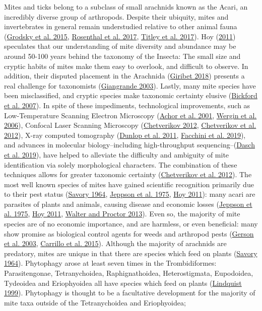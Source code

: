 \documentclass{ufdissertation}[overrideChapters] %
\begin{document}
{Mites and ticks belong to a subclass of small arachnids known as the Acari, an incredibly diverse group of arthropods. Despite their ubiquity, mites and invertebrates in general remain understudied relative to other animal fauna (\protect\hyperlink{ref-Grodsky2015}{Grodsky et al. 2015}, \protect\hyperlink{ref-Rosenthal2017}{Rosenthal et al. 2017}, \protect\hyperlink{ref-Titley2017}{Titley et al. 2017}). Hoy (\protect\hyperlink{ref-Hoy2011}{2011}) speculates that our understanding of mite diversity and abundance may be around 50-100 years behind the taxonomy of the Insecta: The small size and cryptic habits of mites make them easy to overlook, and difficult to observe. In addition, their disputed placement in the Arachnida (\protect\hyperlink{ref-Giribet2018}{Giribet 2018}) presents a real challenge for taxonomists (\protect\hyperlink{ref-Giangrande2003}{Giangrande 2003}). Lastly, many mite species have been misclassified, and cryptic species make taxonomic certainty elusive (\protect\hyperlink{ref-Bickford2007}{Bickford et al. 2007}). In spite of these impediments, technological improvements, such as Low-Temperature Scanning Electron Microscopy (\protect\hyperlink{ref-Achor2001}{Achor et al. 2001}, \protect\hyperlink{ref-Wergin2006}{Wergin et al. 2006}), Confocal Laser Scanning Microscopy (\protect\hyperlink{ref-Chetverikov2012}{Chetverikov 2012}, \protect\hyperlink{ref-Chetverikov2012a}{Chetverikov et al. 2012}), X-ray computed tomography (\protect\hyperlink{ref-Dunlop2011}{Dunlop et al. 2011}, \protect\hyperlink{ref-Facchini2019}{Facchini et al. 2019}), and advances in molecular biology--including high-throughput sequencing--(\protect\hyperlink{ref-Dasch2019}{Dasch et al. 2019}), have helped to alleviate the difficulty and ambiguity of mite identification via solely morphological characters. The combination of these techniques allows for greater taxonomic certainty (\protect\hyperlink{ref-Chetverikov2012a}{Chetverikov et al. 2012}). The most well known species of mites have gained scientific recognition primarily due to their pest status (\protect\hyperlink{ref-Savory1964}{Savory 1964}, \protect\hyperlink{ref-Jeppson1975}{Jeppson et al. 1975}, \protect\hyperlink{ref-Hoy2011}{Hoy 2011}): many acari are parasites of plants and animals, causing disease and economic losses (\protect\hyperlink{ref-Jeppson1975}{Jeppson et al. 1975}, \protect\hyperlink{ref-Hoy2011}{Hoy 2011}, \protect\hyperlink{ref-Walter2013}{Walter and Proctor 2013}). Even so, the majority of mite species are of no economic importance, and are harmless, or even beneficial: many show promise as biological control agents for weeds and arthropod pests (\protect\hyperlink{ref-Gerson2003}{Gerson et al. 2003}, \protect\hyperlink{ref-Carrillo2015}{Carrillo et al. 2015}). Although the majority of arachnids are predatory, mites are unique in that there are species which feed on plants (\protect\hyperlink{ref-Savory1964}{Savory 1964}). Phytophagy arose at least seven times in the Trombidiformes: Parasitengonae, Tetranychoidea, Raphignathoidea, Heterostigmata, Eupodoidea, Tydeoidea and Eriophyoidea all have species which feed on plants (\protect\hyperlink{ref-Lindquist1999}{Lindquist 1999}). Phytophagy is thought to be a facultative development for the majority of mite taxa outside of the Tetranychoidea and Eriophyoidea; }
\end{document}

